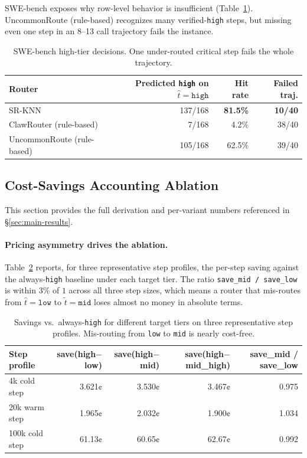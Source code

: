 SWE-bench exposes why row-level behavior is insufficient
(Table~\ref{tab:swe-high}). UncommonRoute (rule-based) recognizes many
verified-\texttt{high} steps, but missing even one step in an 8--13 call
trajectory fails the instance.

\begin{table}[ht]
\centering
\small
\begin{tabular}{lrrr}
\toprule
Router & Predicted \texttt{high} on $\hat{t}=\texttt{high}$ & Hit rate & Failed traj. \\
\midrule
SR-KNN       & 137/168 & \textbf{81.5\%} & \textbf{10/40} \\
ClawRouter (rule-based) & 7/168   & 4.2\%  & 38/40 \\
UncommonRoute (rule-based) & 105/168 & 62.5\% & 39/40 \\
\bottomrule
\end{tabular}
\caption{SWE-bench high-tier decisions. One under-routed critical step fails
the whole trajectory.}
\label{tab:swe-high}
\end{table}

\subsection{Cost-Savings Accounting Ablation}
\label{app:cost-ablation}

This section provides the full derivation and per-variant numbers referenced in \S\ref{sec:main-results}.

\paragraph{Pricing asymmetry drives the ablation.}
Table~\ref{tab:save-asymmetry} reports, for three representative step profiles, the per-step saving against the always-\texttt{high} baseline under each target tier. The ratio \texttt{save\_mid / save\_low} is within 3\% of $1$ across all three step sizes, which means a router that mis-routes from $\hat{t}=\texttt{low}$ to $\tilde{t}=\texttt{mid}$ loses almost no money in absolute terms.

\begin{table}[ht]
\centering
\small
\caption{Savings vs.\ always-\texttt{high} for different target tiers on three representative step profiles.
Mis-routing from \texttt{low} to \texttt{mid} is nearly cost-free.}
\label{tab:save-asymmetry}
\begin{tabular}{lrrrr}
\toprule
Step profile & save(high$-$low) & save(high$-$mid) & save(high$-$mid\_high) & save\_mid / save\_low \\
\midrule
4k cold step     & 3.621¢ & 3.530¢ & 3.467¢ & 0.975 \\
20k warm step    & 1.965¢ & 2.032¢ & 1.900¢ & 1.034 \\
100k cold step   & 61.13¢ & 60.65¢ & 62.67¢ & 0.992 \\
\bottomrule
\end{tabular}
\end{table}

